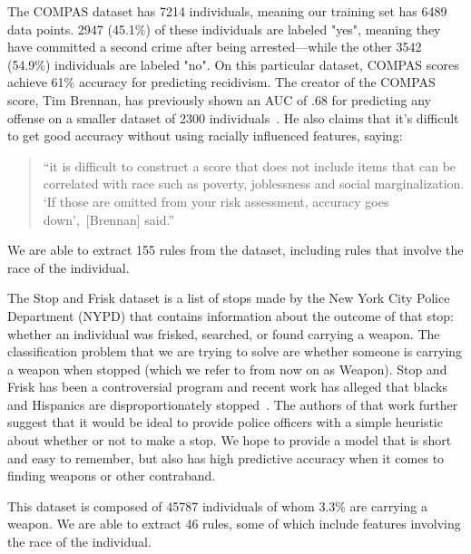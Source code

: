 The COMPAS dataset has 7214 individuals, meaning our training set has 6489 data points.
2947 (45.1\%) of these individuals are labeled "yes", meaning they have committed a second crime after being arrested---while the other 3542 (54.9\%) individuals are labeled "no".
On this particular dataset, COMPAS scores achieve 61\% accuracy for predicting recidivism. 
The creator of the COMPAS score, Tim Brennan, has previously shown an AUC of .68 for predicting any offense on a smaller dataset of 2300 individuals~\cite{BrennanDiEh09}.
He also claims that it's difficult to get good accuracy without using racially influenced features, saying:
\begin{quote}
``it is difficult to construct a score that does not include items that can be correlated with race such as poverty, joblessness and social marginalization. `If those are omitted from your risk assessment, accuracy goes down',~[Brennan] said.''~\cite{LarsonMaKiAn16}
\end{quote}
\noindent We are able to extract 155 rules from the dataset, including rules that involve the race of the individual.

The Stop and Frisk dataset is a list of stops made by the New York City Police Department (NYPD) that contains information about the outcome of that stop: whether an individual was frisked, searched, or found carrying a weapon.
The classification problem that we are trying to solve are whether someone is carrying a weapon when stopped (which we refer to from now on as Weapon).
Stop and Frisk has been a controversial program and recent work has alleged that blacks and Hispanics are disproportionately stopped~\cite{GoelRaSh16}.
The authors of that work further suggest that it would be ideal to provide police officers with a simple heuristic about whether or not to make a stop.
We hope to provide a model that is short and easy to remember, but also has high predictive accuracy when it comes to finding weapons or other contraband.

This dataset is composed of 45787 individuals of whom 3.3\% are carrying a weapon.
We are able to extract 46 rules, some of which include features involving the race of the individual.
